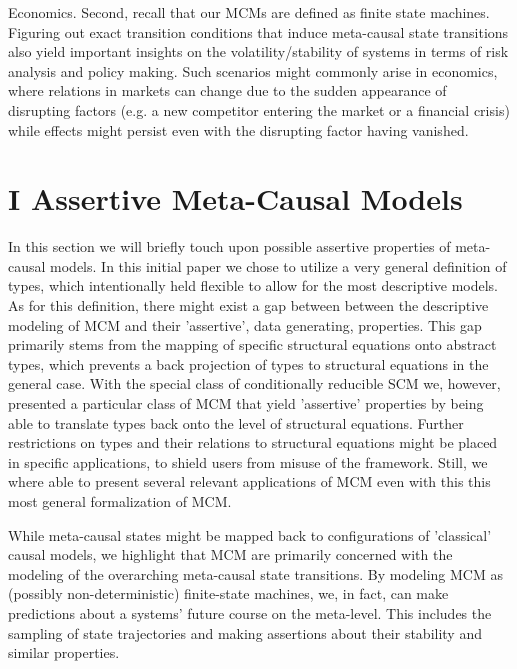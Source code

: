 \documentclass[10pt]{article}
\begin{document}
Economics. Second, recall that our MCMs are defined as finite state machines. Figuring out exact transition conditions that induce meta-causal state transitions also yield important insights on the volatility/stability of systems in terms of risk analysis and policy making. Such scenarios might commonly arise in economics, where relations in markets can change due to the sudden appearance of disrupting factors (e.g. a new competitor entering the market or a financial crisis) while effects might persist even with the disrupting factor having vanished.

\section*{I Assertive Meta-Causal Models}
In this section we will briefly touch upon possible assertive properties of meta-causal models. In this initial paper we chose to utilize a very general definition of types, which intentionally held flexible to allow for the most descriptive models. As for this definition, there might exist a gap between between the descriptive modeling of MCM and their 'assertive', data generating, properties. This gap primarily stems from the mapping of specific structural equations onto abstract types, which prevents a back projection of types to structural equations in the general case. With the special class of conditionally reducible SCM we, however, presented a particular class of MCM that yield 'assertive' properties by being able to translate types back onto the level of structural equations. Further restrictions on types and their relations to structural equations might be placed in specific applications, to shield users from misuse of the framework. Still, we where able to present several relevant applications of MCM even with this this most general formalization of MCM.

While meta-causal states might be mapped back to configurations of 'classical' causal models, we highlight that MCM are primarily concerned with the modeling of the overarching meta-causal state transitions. By modeling MCM as (possibly non-deterministic) finite-state machines, we, in fact, can make predictions about a systems' future course on the meta-level. This includes the sampling of state trajectories and making assertions about their stability and similar properties.
\end{document}
